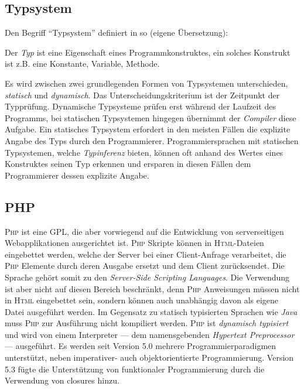 \subsection{Typsystem}
\label{sec:typesystem}

Den Begriff \enquote{Typsystem} definiert \citeauthor{voelterDSLEngineering} in \cite[][S. 253]{voelterDSLEngineering} so (eigene Übersetzung):


Der \emph{Typ} ist eine Eigenschaft eines Programmkonstruktes, ein solches Konstrukt ist z.B. eine Konstante, Variable, Methode.

Es wird zwischen zwei grundlegenden Formen von Typsystemen unterschieden, \emph{statisch} und \emph{dynamisch}. Das Unterscheidungskriterium ist der Zeitpunkt der Typprüfung. Dynamische Typsysteme prüfen erst während der Laufzeit des Programms, bei statischen Typsystemen hingegen übernimmt der \emph{Compiler} diese Aufgabe. Ein statisches Typsystem erfordert in den meisten Fällen die explizite Angabe des Typs durch den Programmierer. Programmiersprachen mit statischen Typsystemen, welche \emph{Typinferenz} bieten, können oft anhand des Wertes eines Konstruktes seinen Typ erkennen und ersparen in diesen Fällen dem Programmierer dessen explizite Angabe.

\subsection{PHP}
\label{sec:php}

\textsc{Php} ist eine \gls{GPL}, die aber vorwiegend auf die Entwicklung von serverseitigen Webapplikationen ausgerichtet ist. \textsc{Php} Skripte können in \textsc{Html}-Dateien eingebettet werden, welche der Server bei einer Client-Anfrage verarbeitet, die \textsc{Php} Elemente durch deren Ausgabe ersetzt und dem Client zurücksendet. Die Sprache gehört somit zu den \emph{Server-Side Scripting Languages}. Die Verwendung ist aber nicht auf diesen Bereich beschränkt, denn \textsc{Php} Anweisungen müssen nicht in \textsc{Html} eingebettet sein, sondern können auch unabhängig davon als eigene Datei ausgeführt werden.
Im Gegensatz zu statisch typisierten Sprachen wie \emph{Java} muss \textsc{Php} zur Ausführung nicht kompiliert werden. \textsc{Php} ist \emph{dynamisch typisiert} und wird von einem Interpreter --- dem namensgebenden \emph{Hypertext Preprocessor} --- ausgeführt.
Es werden seit Version 5.0 mehrere Programmierparadigmen unterstützt, neben imperativer- auch objektorientierte Programmierung. Version 5.3 fügte die Unterstützung von funktionaler Programmierung durch die Verwendung von \glspl{closure} hinzu.

